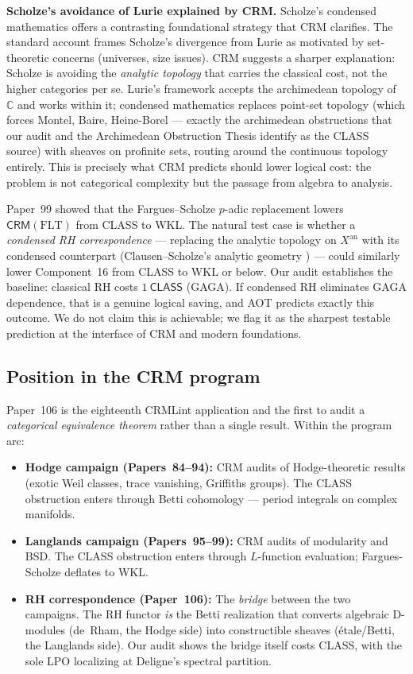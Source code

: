 \documentclass[11pt,a4paper]{article}
\theoremstyle{plain}
\theoremstyle{definition}
\newcommand{\WKL}{\textsf{WKL}}
\newcommand{\CLASS}{\textsf{CLASS}}
\newcommand{\CRM}{\textsf{CRM}}
\newcommand{\C}{\mathbb{C}}
\begin{document}
\medskip\noindent\textbf{Scholze's avoidance of Lurie explained by CRM.}
Scholze's condensed mathematics \cite{ClausenScholze2022} offers a contrasting foundational strategy that CRM clarifies.
The standard account frames Scholze's divergence from Lurie as motivated by set-theoretic concerns (universes, size issues).
CRM suggests a sharper explanation: Scholze is avoiding the \emph{analytic topology} that carries the classical cost, not the higher categories per se.
Lurie's framework accepts the archimedean topology of $\C$ and works within it; condensed mathematics replaces point-set topology (which forces Montel, Baire, Heine-Borel --- exactly the archimedean obstructions that our audit and the Archimedean Obstruction Thesis identify as the \CLASS{} source) with sheaves on profinite sets, routing around the continuous topology entirely.
This is precisely what CRM predicts should lower logical cost: the problem is not categorical complexity but the passage from algebra to analysis.

Paper~99 showed that the Fargues--Scholze $p$-adic replacement lowers $\CRM(\mathrm{FLT})$ from \CLASS{} to \WKL.
The natural test case is whether a \emph{condensed RH correspondence} --- replacing the analytic topology on $X^{\mathrm{an}}$ with its condensed counterpart (Clausen--Scholze's analytic geometry \cite{ClausenScholze2022}) --- could similarly lower Component~16 from \CLASS{} to \WKL{} or below.
Our audit establishes the baseline: classical RH costs $1\ \CLASS$ (GAGA).
If condensed RH eliminates GAGA dependence, that is a genuine logical saving, and AOT predicts exactly this outcome.
We do not claim this is achievable; we flag it as the sharpest testable prediction at the interface of CRM and modern foundations.

\subsection{Position in the CRM program}

Paper~106 is the eighteenth CRMLint application and the first to audit a \emph{categorical equivalence theorem} rather than a single result.
Within the program arc:

\begin{itemize}[nosep]
\item \textbf{Hodge campaign (Papers~84--94):} CRM audits of Hodge-theoretic results (exotic Weil classes, trace vanishing, Griffiths groups). The CLASS obstruction enters through Betti cohomology --- period integrals on complex manifolds.
\item \textbf{Langlands campaign (Papers~95--99):} CRM audits of modularity and BSD. The CLASS obstruction enters through $L$-function evaluation; Fargues-Scholze deflates to WKL.
\item \textbf{RH correspondence (Paper~106):} The \emph{bridge} between the two campaigns. The RH functor \emph{is} the Betti realization that converts algebraic D-modules (de~Rham, the Hodge side) into constructible sheaves (\'etale/Betti, the Langlands side). Our audit shows the bridge itself costs CLASS, with the sole LPO localizing at Deligne's spectral partition.
\end{itemize}
\end{document}
